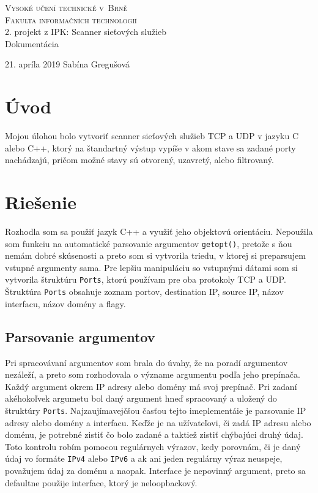 \documentclass[11pt, a4paper]{article}
\begin{document}
\begin{titlepage}
\begin{center}
\Huge
\textsc{Vysoké učení technické v~Brně}\\
\huge
\textsc{Fakulta informačních technologií}\\
\LARGE 2. projekt z IPK: Scanner sieťových služieb\\
\Huge Dokumentácia
\end{center}
{\Large 21. apríla 2019 \hfill
Sabína Gregušová}
\end{titlepage}

\tableofcontents
\clearpage

\section{Úvod}
Mojou úlohou bolo vytvoriť scanner sieťových služieb TCP a UDP v jazyku C alebo C++, ktorý na štandartný výstup vypíše v akom stave sa zadané porty nachádzajú, pričom možné stavy sú otvorený, uzavretý, alebo filtrovaný.

\section{Riešenie}
Rozhodla som sa použiť jazyk C++ a využiť jeho objektovú orientáciu. Nepoužila som funkciu na automatické parsovanie argumentov \texttt{getopt()}, pretože s ňou nemám dobré skúsenosti a preto som si vytvorila triedu, v ktorej si preparsujem vstupné argumenty sama. Pre lepšiu manipuláciu so vstupnými dátami som si vytvorila štruktúru \texttt{Ports}, ktorú používam pre oba protokoly TCP a UDP. Štruktúra \texttt{Ports} obsahuje zoznam portov, destination IP, source IP, názov interfacu, názov domény a flagy.

\subsection{Parsovanie argumentov}
Pri spracovávaní argumentov som brala do úvahy, že na poradí argumentov nezáleží, a preto som rozhodovala o význame argumentu podľa jeho prepínača. Každý argument okrem IP adresy alebo domény má svoj prepínač. Pri zadaní akéhokoľvek argumetu bol daný argument hneď spracovaný a uložený do štruktúry \texttt{Ports}. Najzaujímavejčšou časťou tejto imeplementáie je parsovanie IP adresy alebo domény a interfacu. Keďže je na užívateľovi, či zadá IP adresu alebo doménu, je potrebné zistiť čo bolo zadané a taktiež zistiť chýbajúci druhý údaj. Toto kontrolu robím pomocou regulárnych výrazov, kedy porovnám, či je daný údaj vo formáte \texttt{IPv4} alebo \texttt{IPv6} a ak ani jeden regulárny výraz neuspeje, považujem údaj za doménu a naopak. Interface je nepovinný argument, preto sa defaultne použije interface, ktorý je neloopbackový. 
\end{document}
